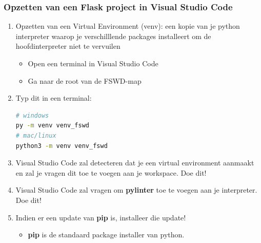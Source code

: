 \documentclass{article}
\newcommand{\bold}[1]{\textbf{#1}}
\begin{document}
\subsubsection{Opzetten van een Flask project in Visual Studio Code}
\begin{enumerate}
    \item Opzetten van een Virtual Environment (venv): een kopie van je python interpreter waarop je verschilllende packages installeert om de hoofdinterpreter niet te vervuilen
    \begin{itemize}
        \item Open een terminal in Visual Studio Code
        \item Ga naar de root van de FSWD-map
    \end{itemize}
    \item Typ dit in een terminal:
    \begin{lstlisting}[language=bash]
# windows
py -m venv venv_fswd
# mac/linux
python3 -m venv venv_fswd
    \end{lstlisting}
    \item Visual Studio Code zal detecteren dat je een virtual environment aanmaakt en zal je vragen dit toe te voegen aan je workspace. Doe dit!
    \item Visual Studio Code zal vragen om \bold{pylinter} toe te voegen aan je interpreter. Doe dit!
    \item Indien er een update van \bold{pip} is, installeer die update!
    \begin{itemize}
        \item \bold{pip} is de standaard package installer van python.
    \end{itemize}
\end{enumerate}
\end{document}
